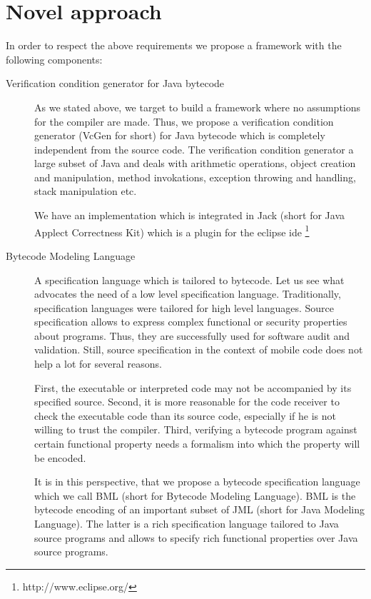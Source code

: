 \section{Novel approach}
In order to respect the above requirements we propose a framework with the following components:
\begin{description}
   \item [Verification condition generator for Java bytecode]
         As we stated above, we target to build a framework where no assumptions for the compiler are made.
	 Thus, we propose a verification condition generator (VcGen for short) for Java bytecode which is completely independent from 
	 the source code. The verification condition generator a large subset of Java and deals with
	 arithmetic operations, object creation and manipulation,
	 method invokations, exception throwing and handling, stack manipulation etc. 
	 
	 We have an implementation which is integrated in Jack (short for Java Applect Correctness Kit) \cite{BRL-JACK} which is a plugin
	 for the eclipse ide \footnote{http://www.eclipse.org/}
	 
   \item [Bytecode Modeling Language] 
         A specification language which is tailored to bytecode. Let us see what advocates the need of a
	 low level specification language. Traditionally, specification languages were tailored for high level languages.  
	 Source  specification allows to express complex functional or security properties about programs.
	 Thus, they are successfully  used for software audit and validation. Still, source specification in 
	 the context of mobile code does not help a lot for several reasons.


	 First, the executable or interpreted code  may not be accompanied by its specified  source. Second, it is more reasonable for the 
	 code receiver to check the executable code than its source code, especially if he is not willing to trust the compiler.
	 Third, verifying a bytecode program against certain functional property needs a formalism into which the property will be encoded. 


	 It is in this perspective, that we propose  a bytecode specification language which we call BML (short for Bytecode Modeling Language). 
	 BML is the bytecode encoding of an important subset of  JML (short for Java Modeling Language). The latter is a rich specification language tailored to Java source programs and
	 allows to specify rich functional properties over Java source programs.



\end{description}

